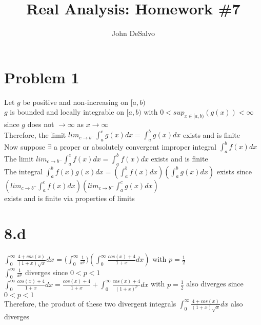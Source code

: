 \documentclass[12pt]{article}
\begin{document}
\pagestyle{plain}

\title{Real Analysis: Homework \#7}
\author{John DeSalvo}
\maketitle

\section{Problem 1}
Let $g$ be positive and non-increasing on $[a, b)$ \\
$g$ is bounded and locally integrable on $[a, b)$ with $0 < sup_{x \in [a, b)}(g(x)) < \infty$ since $g$ does not $\to \infty$ as $x \to \infty$ \\
Therefore, the limit $lim_{c \to b^{-}} \int_{a}^{c}g(x)dx = \int_{a}^{b}g(x)dx$ exists and is finite \\
Now suppose $\exists$ a proper or absolutely convergent improper integral $\int_{a}^{b}f(x)dx$ \\
The limit $lim_{c \to b^{-}} \int_{a}^{c}f(x)dx = \int_{a}^{b}f(x)dx$ exists and is finite \\
The integral $\int_{a}^{b}f(x)g(x)dx = (\int_{a}^{b}f(x)dx) (\int_{a}^{b}g(x)dx)$ exists since \\
$(lim_{c \to b^{-}} \int_{a}^{c}f(x)dx) (lim_{c \to b^{-}} \int_{a}^{c}g(x)dx)$ \\
exists and is finite via properties of limits 

\section{8.d}
$\int_{0}^{\infty}\frac{4+cos(x)}{(1+x) \sqrt{x}}dx$ = ($\int_{0}^{\infty}\frac{1}{x^{p}})(\int_{0}^{\infty}\frac{cos(x)+4}{1+x}dx)$ with $p = \frac{1}{2}$ \\
$\int_{0}^{\infty}\frac{1}{x^{p}}$ diverges since $0 < p < 1$ \\
$\int_{0}^{\infty}\frac{cos(x)+4}{1+x}dx = \frac{cos(x)+4}{1+x} + \int_{0}^{\infty}\frac{cos(x)+4}{(1+x)^{p}}dx$ with $p = \frac{1}{2}$ also diverges since $0 < p < 1$ \\
Therefore, the product of these two divergent integrals $\int_{0}^{\infty}\frac{4+cos(x)}{(1+x) \sqrt{x}}dx$ also diverges 
\end{document}
